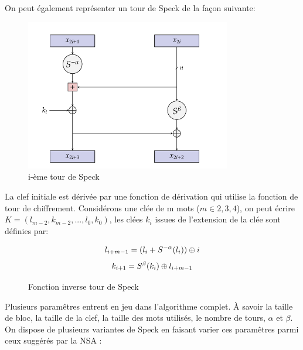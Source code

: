 			On peut également représenter un tour de Speck de la façon suivante:

			\begin{figure}[H]
				\centering
				\includegraphics[width=0.8\textwidth]{imgs/roundSpeck.png}
				\caption{i-ème tour de Speck}
			 	\label{roundSpeck}
			\end{figure}

			\vspace{0.3cm}

			La clef initiale est dérivée par une fonction de dérivation qui utilise la
			fonction de tour de chiffrement. Considérons une clée de m mots ($m\in {2,3,4}$),
			on peut écrire $ K = (l_{m-2},k_{m-2}, ..., l_0,k_0)$, les clées $k_i$ issues
			de l'extension de la clée sont définies par:

			\begin{figure}[H]
				\centering
				\[
					l_{i+m-1} = (l_i + S^{-\alpha}(l_i)) \mathbin{\oplus} i
				\]
				\[
					k_{i+1} = S^\beta (k_i) \mathbin{\oplus} l_{i+m-1}
				\]
				\caption{Fonction inverse tour de Speck}
				\label{tourSpeck}
			\end{figure}

				Plusieurs paramêtres entrent en jeu dans l'algorithme complet. À savoir
			la taille de bloc, la taille de la clef, la taille des mots utilisés,
			le nombre de tours, $\alpha$ et $\beta$. On dispose de plusieurs variantes
			de Speck en faisant varier ces paramêtres parmi ceux suggérés par la NSA \cite{speck_iot}:



			\vspace{0.5cm}

